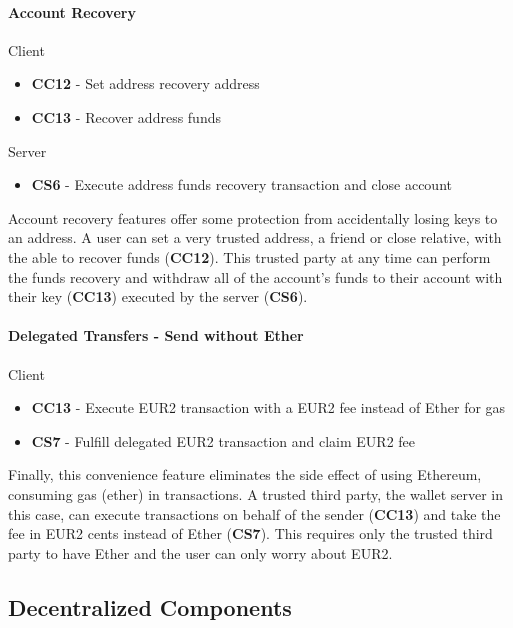 \documentclass[a4paper,12pt]{article} %
\begin{document}
{{\paragraph*{Account Recovery}

Client
\begin{itemize}
	\item \textbf{CC12} - Set address recovery address
	\item \textbf{CC13} - Recover address funds
\end{itemize}

Server
\begin{itemize}
	\item \textbf{CS6} - Execute address funds recovery transaction and close account
\end{itemize}

Account recovery features offer some protection from accidentally losing keys to an address. A user can set a very trusted address, a friend or close relative, with the able to recover funds (\textbf{CC12}). This trusted party at any time can perform the funds recovery and withdraw all of the account's funds to their account with their key (\textbf{CC13}) executed by the server (\textbf{CS6}).

\paragraph*{Delegated Transfers - Send without Ether}

Client
\begin{itemize}
	\item \textbf{CC13} - Execute EUR2 transaction with a EUR2 fee instead of Ether for gas
\end{itemize}

\begin{itemize}
	\item \textbf{CS7} - Fulfill delegated EUR2 transaction and claim EUR2 fee
\end{itemize}

Finally, this convenience feature eliminates the side effect of using Ethereum, consuming gas (ether) in transactions. A trusted third party, the wallet server in this case, can execute transactions on behalf of the sender (\textbf{CC13}) and take the fee in EUR2 cents instead of Ether (\textbf{CS7}). This requires only the trusted third party to have Ether and the user can only worry about EUR2.

\subsection{Decentralized Components} \label{ssec:3.4}

}}
\end{document}
